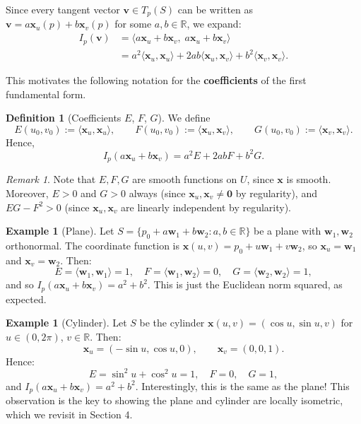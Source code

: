 \documentclass[10pt, a4paper]{article}
\theoremstyle{plain}
\theoremstyle{definition}
\newtheorem{definition}[theorem]{Definition}
\newtheorem{example}[theorem]{Example}
\theoremstyle{remark}
\newtheorem{remark}[theorem]{Remark}
\begin{document}
Since every tangent vector $\mathbf{v} \in T_p(S)$ can be written as
$\mathbf{v} = a\mathbf{x}_u(p) + b\mathbf{x}_v(p)$ for some $a, b \in \mathbb{R}$,
we expand:
\begin{align*}
  I_p(\mathbf{v})
  &= \langle a\mathbf{x}_u + b\mathbf{x}_v,\; a\mathbf{x}_u + b\mathbf{x}_v \rangle \\
  &= a^2\langle \mathbf{x}_u, \mathbf{x}_u \rangle
   + 2ab\langle \mathbf{x}_u, \mathbf{x}_v \rangle
   + b^2\langle \mathbf{x}_v, \mathbf{x}_v \rangle.
\end{align*}

This motivates the following notation for the \textbf{coefficients} of the first
fundamental form.

\begin{definition}[Coefficients $E$, $F$, $G$]
  We define
  \[
    E(u_0, v_0) := \langle \mathbf{x}_u, \mathbf{x}_u \rangle, \qquad
    F(u_0, v_0) := \langle \mathbf{x}_u, \mathbf{x}_v \rangle, \qquad
    G(u_0, v_0) := \langle \mathbf{x}_v, \mathbf{x}_v \rangle.
  \]
  Hence,
  \[
    \boxed{I_p(a\mathbf{x}_u + b\mathbf{x}_v) = a^2 E + 2ab F + b^2 G.}
  \]
\end{definition}

\begin{remark}
  Note that $E, F, G$ are smooth functions on $U$, since $\mathbf{x}$ is smooth.
  Moreover, $E > 0$ and $G > 0$ always (since $\mathbf{x}_u, \mathbf{x}_v \neq \mathbf{0}$
  by regularity), and $EG - F^2 > 0$ (since $\mathbf{x}_u, \mathbf{x}_v$ are linearly
  independent by regularity).
\end{remark}



\begin{example}[Plane]
  Let $S = \{p_0 + a\mathbf{w}_1 + b\mathbf{w}_2 : a, b \in \mathbb{R}\}$ be a plane
  with $\mathbf{w}_1, \mathbf{w}_2$ orthonormal. The coordinate function is
  $\mathbf{x}(u, v) = p_0 + u\mathbf{w}_1 + v\mathbf{w}_2$, so
  $\mathbf{x}_u = \mathbf{w}_1$ and $\mathbf{x}_v = \mathbf{w}_2$. Then:
  \[
    E = \langle \mathbf{w}_1, \mathbf{w}_1 \rangle = 1, \quad
    F = \langle \mathbf{w}_1, \mathbf{w}_2 \rangle = 0, \quad
    G = \langle \mathbf{w}_2, \mathbf{w}_2 \rangle = 1,
  \]
  and so $I_p(a\mathbf{x}_u + b\mathbf{x}_v) = a^2 + b^2$. This is just the Euclidean
  norm squared, as expected.
\end{example}

\begin{example}[Cylinder]
  Let $S$ be the cylinder $\mathbf{x}(u, v) = (\cos u, \sin u, v)$ for $u \in (0, 2\pi)$,
  $v \in \mathbb{R}$. Then:
  \[
    \mathbf{x}_u = (-\sin u, \cos u, 0), \qquad
    \mathbf{x}_v = (0, 0, 1).
  \]
  Hence:
  \[
    E = \sin^2 u + \cos^2 u = 1, \quad
    F = 0, \quad
    G = 1,
  \]
  and $I_p(a\mathbf{x}_u + b\mathbf{x}_v) = a^2 + b^2$. Interestingly, this is the same
  as the plane! This observation is the key to showing the plane and cylinder are locally
  isometric, which we revisit in Section 4.
\end{example}
\end{document}
